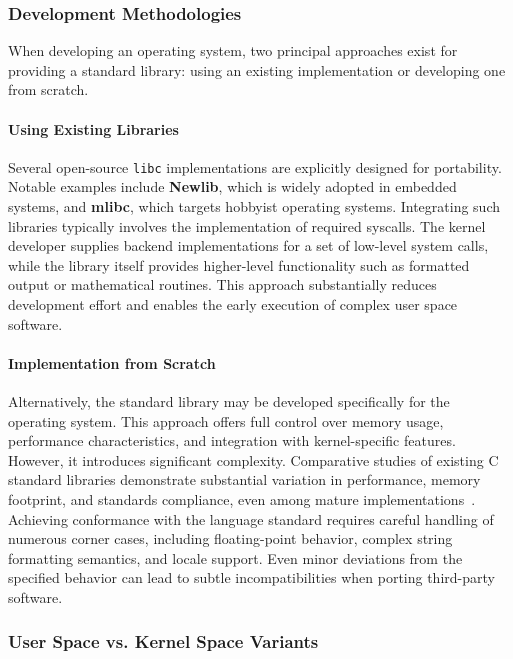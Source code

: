 \documentclass[a4paper,10pt,twoside]{report}
\theoremstyle{definition}
\begin{document}
\subsubsection{Development Methodologies}

When developing an operating system, two principal approaches exist for providing a standard library: using an existing implementation or developing one from scratch.

\paragraph{Using Existing Libraries}

Several open-source \texttt{libc} implementations are explicitly designed for portability. Notable examples include \textbf{Newlib}\cite{newlib_home}, which is widely adopted in embedded systems, and \textbf{mlibc}\cite{mlibc_repo}, which targets hobbyist operating systems. Integrating such libraries typically involves the implementation of required syscalls. The kernel developer supplies backend implementations for a set of low-level system calls, while the library itself provides higher-level functionality such as formatted output or mathematical routines. This approach substantially reduces development effort and enables the early execution of complex user space software.

\paragraph{Implementation from Scratch}

Alternatively, the standard library may be developed specifically for the operating system. This approach offers full control over memory usage, performance characteristics, and integration with kernel-specific features. However, it introduces significant complexity. Comparative studies of existing C standard libraries demonstrate substantial variation in performance, memory footprint, and standards compliance, even among mature implementations~\cite{libc_comparison}. Achieving conformance with the language standard requires careful handling of numerous corner cases, including floating-point behavior, complex string formatting semantics, and locale support. Even minor deviations from the specified behavior can lead to subtle incompatibilities when porting third-party software.

\subsubsection{User Space vs. Kernel Space Variants}
\end{document}
